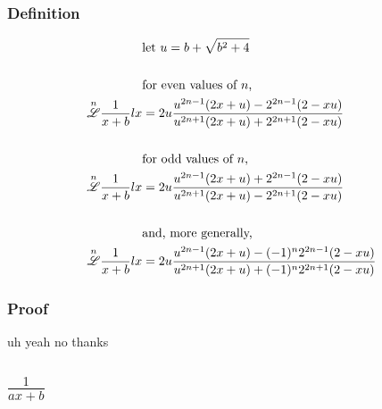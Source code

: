 \documentclass[12pt, letterpaper]{article}
\begin{document}
\subsubsection{Definition}
\begin{equation}
    \begin{split}
        &\text{let } u = b+\sqrt{b^2+4}\\
        \\
        &\text{for even values of }n\text{,}\\
        \overset{n}{\mathscr{L}}\frac{1}{x+b}lx & = 2u\frac{u^{2n-1}(2x+u)-2^{2n-1}(2-xu)}{u^{2n+1}(2x+u)+2^{2n+1}(2-xu)}\\
        \\
        &\text{for odd values of }n\text{,}\\
        \overset{n}{\mathscr{L}}\frac{1}{x+b}lx & = 2u\frac{u^{2n-1}(2x+u)+2^{2n-1}(2-xu)}{u^{2n+1}(2x+u)-2^{2n+1}(2-xu)}\\
        \\
        &\text{and, more generally,}\\
        \overset{n}{\mathscr{L}}\frac{1}{x+b}lx & = 2u\frac{u^{2n-1}(2x+u)-(-1)^n2^{2n-1}(2-xu)}{u^{2n+1}(2x+u)+(-1)^n2^{2n+1}(2-xu)}\\
    \end{split}
\end{equation}
\subsubsection{Proof}
uh yeah no thanks

\subsection{$\frac{1}{ax+b}$}
\end{document}
